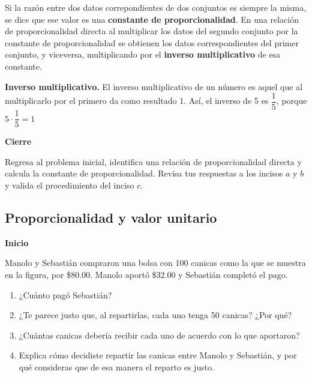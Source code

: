 \documentclass[11pt]{book}
\begin{document}
\begin{boxH}
  Si la razón entre dos datos correpondientes de dos conjuntos es siempre la misma,
  se dice que ese valor es una \textbf{constante de proporcionalidad}. En una relación de
  proporcionalidad directa al multiplicar los datos del segundo conjunto por la constante
  de proporcionalidad se obtienen los datos correspondientes del primer conjunto, y
  viceversa, multiplicando por el \textbf{\color{cyan}inverso multiplicativo} de esa constante.
\end{boxH}

\begin{boxH}
  \textbf{\color{cyan}Inverso multiplicativo.}
  El inverso multiplicativo de un número es aquel que al
  multiplicarlo por el primero da como resultado 1.
  Así, el inverso de 5 es $\dfrac{1}{5}$, porque $5\cdot \dfrac{1}{5}=1$
\end{boxH}

\begin{boxK}
  \begin{center}\textbf{Cierre}\end{center}
  Regresa al problema inicial, identifica una relación de proporcionalidad directa y calcula
  la constante de proporcionalidad.
  Revisa tus respuestas a los incisos $a$ y $b$ y valida el procedimiento del inciso $c$.
\end{boxK}
\newpage
\subsection{Proporcionalidad y valor unitario}

\begin{boxK}
  \begin{center}\textbf{Inicio}\end{center}
  Manolo y Sebastián compraron una bolsa con 100 canicas como la que se muestra en la
  figura, por \$80.00. Manolo aportó \$32.00 y Sebastián completó el pago.
  \begin{enumerate}
    \item ¿Cuánto pagó Sebastián?
    \item ¿Te parece justo que, al repartirlas, cada uno tenga 50 canicas? ¿Por qué?
    \item ¿Cuántas canicas debería recibir cada uno de acuerdo con lo que aportaron?
    \item Explica cómo decidiste repartir las canicas entre Manolo y Sebastián, y por qué
          consideras que de esa manera el reparto es justo.
  \end{enumerate}
\end{boxK}
\end{document}
